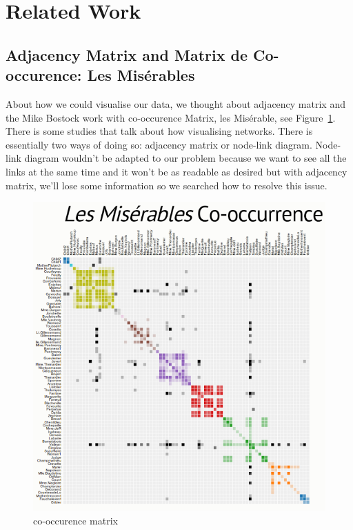 \documentclass{vgtc}
\begin{document}
\section{Related Work}

\subsection{Adjacency Matrix and Matrix de Co-occurence: Les Mis\'erables}
About how we could visualise our data, we thought about adjacency matrix and the Mike Bostock work with co-occurence Matrix, les Mis\'erable\cite{Mis},
see Figure~\ref{fig:mat-co}.
There is some studies that talk about how visualising networks. There is essentially two ways of doing so: adjacency matrix or node-link diagram. Node-link diagram wouldn’t be adapted to our problem because we want to see all the links at the same time and it won’t be as readable as desired but with adjacency matrix, we’ll lose some information so we searched how to resolve this issue.
\begin{figure}[h!]
 \includegraphics[width=\columnwidth]{mat-co}
 \caption{co-occurence matrix}
 \label{fig:mat-co}
\end{figure} 
\end{document}
